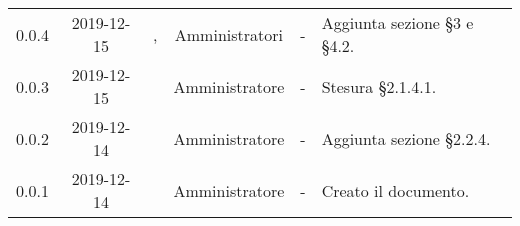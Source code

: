 {\begin{longtable}{ c c  C{2.3cm} c C{3cm} C{3.2cm}}
0.0.4 & 2019-12-15 & \BR{}, \PF{} & Amministratori & - & Aggiunta sezione §3 e §4.2. \\

0.0.3 & 2019-12-15 & \MC{} & Amministratore & - & Stesura §2.1.4.1. \\

0.0.2 & 2019-12-14 & \CE{} & Amministratore & - & Aggiunta sezione §2.2.4. \\

0.0.1 & 2019-12-14 & \CE{} & Amministratore & - & Creato il documento. \\
		
\end{longtable}
}